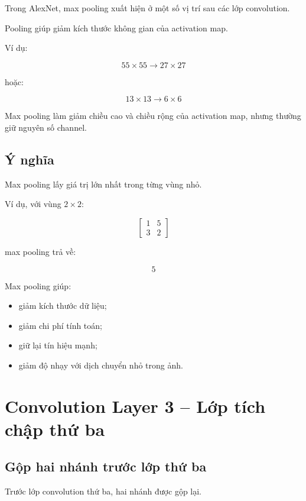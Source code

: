 Trong AlexNet, max pooling xuất hiện ở một số vị trí sau các lớp convolution.

Pooling giúp giảm kích thước không gian của activation map.

Ví dụ:

\[
    55\times55
    \rightarrow
    27\times27
\]

hoặc:

\[
    13\times13
    \rightarrow
    6\times6
\]

\begin{ghinho}
Max pooling làm giảm chiều cao và chiều rộng của activation map, nhưng thường giữ nguyên số channel.
\end{ghinho}

\subsection{Ý nghĩa}

Max pooling lấy giá trị lớn nhất trong từng vùng nhỏ.

Ví dụ, với vùng $2\times2$:

\[
    \begin{bmatrix}
    1 & 5\\
    3 & 2
    \end{bmatrix}
\]

max pooling trả về:

\[
    5
\]

Max pooling giúp:

\begin{itemize}
    \item giảm kích thước dữ liệu;
    \item giảm chi phí tính toán;
    \item giữ lại tín hiệu mạnh;
    \item giảm độ nhạy với dịch chuyển nhỏ trong ảnh.
\end{itemize}

\section{Convolution Layer 3 -- Lớp tích chập thứ ba}

\subsection{Gộp hai nhánh trước lớp thứ ba}

Trước lớp convolution thứ ba, hai nhánh được gộp lại.

